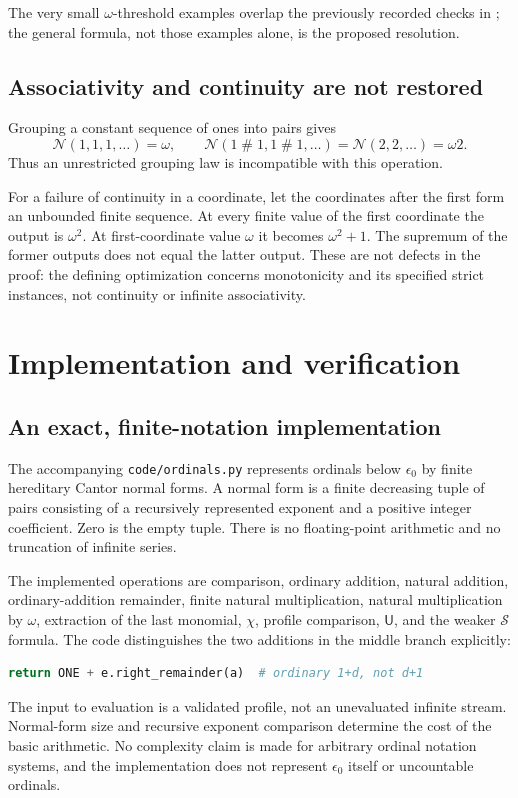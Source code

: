 \documentclass[11pt,a4paper]{article}
\theoremstyle{definition}
\newcommand{\ns}{\mathbin{\#}}
\newcommand{\OpN}{\mathcal N}
\newcommand{\OpS}{\mathcal S}
\newcommand{\FunU}{\mathsf U}
\begin{document}
The very small $\omega$-threshold examples overlap the previously recorded checks in \cite[Remark 6.1]{Lipparini2026extended}; the general formula, not those examples alone, is the proposed resolution.

\subsection{Associativity and continuity are not restored}

Grouping a constant sequence of ones into pairs gives
\[
 \OpN(1,1,1,\ldots)=\omega,
 \qquad
 \OpN(1\ns1,1\ns1,\ldots)=\OpN(2,2,\ldots)=\omega2.
\]
Thus an unrestricted grouping law is incompatible with this operation.

For a failure of continuity in a coordinate, let the coordinates after the first form an unbounded finite sequence. At every finite value of the first coordinate the output is $\omega^2$. At first-coordinate value $\omega$ it becomes $\omega^2+1$. The supremum of the former outputs does not equal the latter output. These are not defects in the proof: the defining optimization concerns monotonicity and its specified strict instances, not continuity or infinite associativity.


\section{Implementation and verification}\label{sec:implementation}

\subsection{An exact, finite-notation implementation}
The accompanying \texttt{code/ordinals.py} represents ordinals below
$\epsilon_0$ by finite hereditary Cantor normal forms. A normal form is a
finite decreasing tuple of pairs consisting of a recursively represented
exponent and a positive integer coefficient. Zero is the empty tuple.
There is no floating-point arithmetic and no truncation of infinite series.

The implemented operations are comparison, ordinary addition, natural
addition, ordinary-addition remainder, finite natural multiplication,
natural multiplication by $\omega$, extraction of the last monomial,
$\chi$, profile comparison, $\FunU$, and the weaker $\OpS$ formula.
The code distinguishes the two additions in the middle branch explicitly:
\begin{lstlisting}[language=Python]
return ONE + e.right_remainder(a)  # ordinary 1+d, not d+1
\end{lstlisting}
The input to evaluation is a validated profile, not an unevaluated infinite
stream. Normal-form size and recursive exponent comparison determine the
cost of the basic arithmetic. No complexity claim is made for arbitrary
ordinal notation systems, and the implementation does not represent
$\epsilon_0$ itself or uncountable ordinals.
\end{document}
